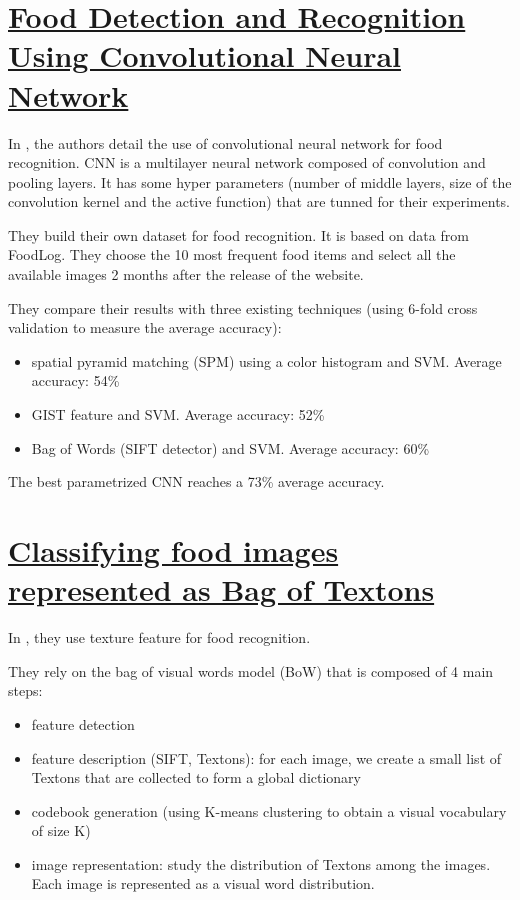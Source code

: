 \section{\href{http://dl.acm.org/citation.cfm?doid=2647868.2654970}{Food Detection and Recognition Using Convolutional Neural Network}}

In \cite{Kagaya2014}, the authors detail the use of convolutional neural network for food recognition. CNN is a multilayer neural network composed of convolution and pooling layers. It has some hyper parameters (number of middle layers, size of the convolution kernel and the active function) that are tunned for their experiments.

They build their own dataset for food recognition. It is based on data from FoodLog. They choose the 10 most frequent food items and select all the available images 2 months after the release of the website.

They compare their results with three existing techniques (using 6-fold cross validation to measure the average accuracy):
\begin{itemize}
    \item spatial pyramid matching (SPM) using a color histogram and SVM. Average accuracy: 54\%
    \item GIST feature and SVM. Average accuracy: 52\%
    \item Bag of Words (SIFT detector) and SVM. Average accuracy: 60\%
\end{itemize}

The best parametrized CNN reaches a 73\% average accuracy.

\section{\href{http://ieeexplore.ieee.org/xpl/articleDetails.jsp?arnumber=7026055}{Classifying food images represented as Bag of Textons}}

In \cite{Farinella2014}, they use texture feature for food recognition.

They rely on the bag of visual words model (BoW) that is composed of 4 main steps:
\begin{itemize}
    \item feature detection 
    \item feature description (SIFT, Textons): for each image, we create a small list of Textons that are collected to form a global dictionary
    \item codebook generation (using K-means clustering to obtain a visual vocabulary of size K)
    \item image representation: study the distribution of Textons among the images. Each image is represented as a visual word distribution.
\end{itemize}

